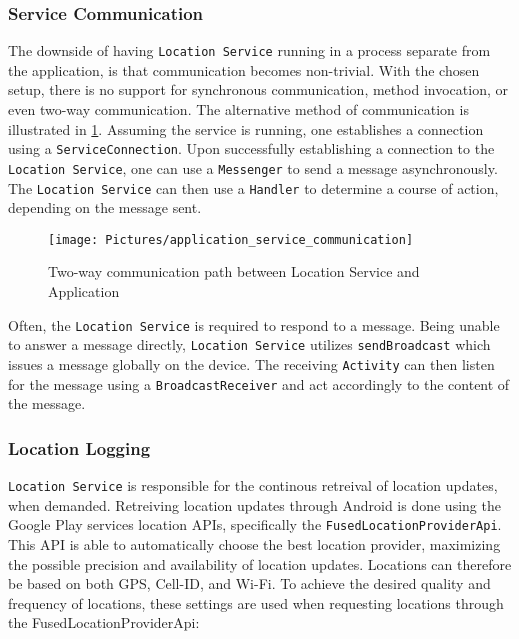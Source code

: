 \subsubsection{Service Communication}\label{subsubsec:service_communication}
The downside of having \texttt{Location Service} running in a process separate from the application, is that communication becomes non-trivial. With the chosen setup, there is no support for synchronous communication, method invocation, or even two-way communication. The alternative method of communication is illustrated in \ref{fig:application_service_communication}. Assuming the service is running, one establishes a connection using a \texttt{ServiceConnection}\citep{android_serviceconnection}. Upon successfully establishing a connection to the \texttt{Location Service}, one can use a \texttt{Messenger}\citep{android_messenger} to send a message asynchronously. The \texttt{Location Service} can then use a \texttt{Handler}\citep{android_handler} to determine a course of action, depending on the message sent.

\begin{figure}[tb]
\centering
\texttt{[image: Pictures/application\_service\_communication]}
\caption{Two-way communication path between Location Service and Application}
\label{fig:application_service_communication}
\end{figure}

Often, the \texttt{Location Service} is required to respond to a message. Being unable to answer a message directly, \texttt{Location Service} utilizes \texttt{sendBroadcast}\citep{android_sendbroadcast} which issues a message globally on the device. The receiving \texttt{Activity} can then listen for the message using a \texttt{BroadcastReceiver}\citep{android_broadcastreceiver} and act accordingly to the content of the message. 

\subsubsection{Location Logging}\label{subsubsec:location_logging}
\texttt{Location Service} is responsible for the continous retreival of location updates, when demanded. Retreiving location updates through Android is done using the Google Play services location APIs, specifically the \texttt{FusedLocationProviderApi}\citep{android_fusedlocationproviderapi}. This API is able to automatically choose the best location provider, maximizing the possible precision and availability of location updates. Locations can therefore be based on both GPS, Cell-ID, and Wi-Fi. To achieve the desired quality and frequency of locations, these settings are used when requesting locations through the FusedLocationProviderApi:

